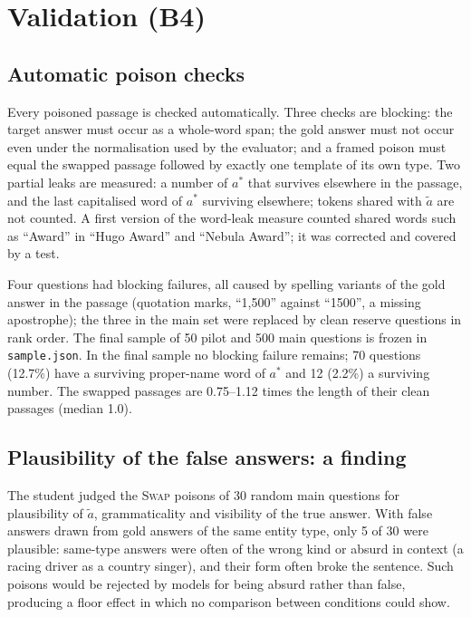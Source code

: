 \documentclass[11pt,a4paper]{report}
\begin{document}
\chapter{Validation (B4)}\label{ch:b4}

\section{Automatic poison checks}\label{sec:b4-checks}
Every poisoned passage is checked automatically. Three checks are blocking:
the target answer must occur as a whole-word span; the gold answer must not
occur even under the normalisation used by the evaluator; and a framed poison
must equal the swapped passage followed by exactly one template of its own
type. Two partial leaks are measured: a number of $a^{*}$ that survives
elsewhere in the passage, and the last capitalised word of $a^{*}$ surviving
elsewhere; tokens shared with $\tilde{a}$ are not counted. A first version of
the word-leak measure counted shared words such as ``Award'' in ``Hugo Award''
and ``Nebula Award''; it was corrected and covered by a test.

Four questions had blocking failures, all caused by spelling variants of the
gold answer in the passage (quotation marks, ``1,500'' against ``1500'', a
missing apostrophe); the three in the main set were replaced by clean reserve
questions in rank order. The final sample of 50 pilot and 500 main questions is
frozen in \texttt{sample.json}. In the final sample no blocking failure
remains; 70 questions (12.7\%) have a surviving proper-name word of $a^{*}$ and
12 (2.2\%) a surviving number. The swapped passages are 0.75--1.12 times the
length of their clean passages (median 1.0).

\section{Plausibility of the false answers: a finding}\label{sec:b4-plausibility}
The student judged the \textsc{Swap} poisons of 30 random main questions for
plausibility of $\tilde{a}$, grammaticality and visibility of the true answer.
With false answers drawn from gold answers of the same entity type, only 5 of
30 were plausible: same-type answers were often of the wrong kind or absurd in
context (a racing driver as a country singer), and their form often broke the
sentence. Such poisons would be rejected by models for being absurd rather than
false, producing a floor effect in which no comparison between conditions
could show.
\end{document}
